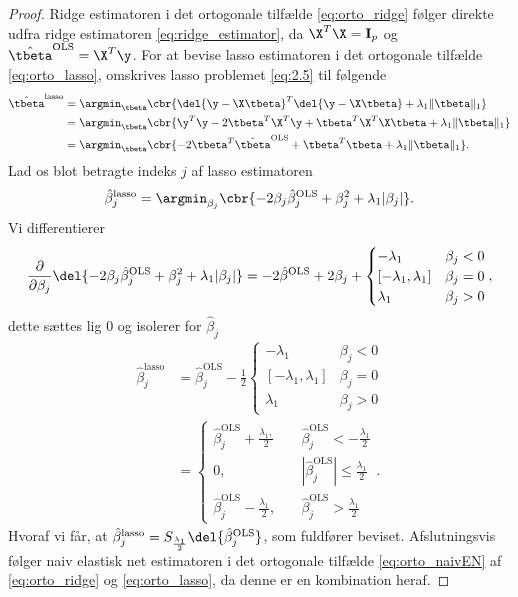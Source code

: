 \begin{proof}
Ridge estimatoren i det ortogonale tilfælde \eqref{eq:orto_ridge} følger direkte udfra ridge estimatoren \eqref{eq:ridge_estimator}, da \(\X^T \X = \mathbf{I}_p\) og \(\hat{\tbeta}^\text{OLS} = \X^T \y\).
For at bevise lasso estimatoren i det ortogonale tilfælde \eqref{eq:orto_lasso}, omskrives lasso problemet \eqref{eq:2.5} til følgende
\begin{align*}
\hat{\tbeta}^\text{lasso} &= \argmin_{\tbeta} \cbr{\del{\y - \X \tbeta}^T \del{\y - \X \tbeta} + \lambda_1 \Vert \tbeta \Vert_1} \\
&= \argmin_{\tbeta} \cbr{ \y^T \y - 2 \tbeta^T \X^T \y + \tbeta^T \X^T \X \tbeta + \lambda_1 \Vert \tbeta \Vert_1} \\
&= \argmin_{\tbeta} \cbr{- 2 \tbeta^T \hat{\tbeta}^\text{OLS} + \tbeta^T \tbeta + \lambda_1 \Vert \tbeta \Vert_1}.
\end{align*}
Lad os blot betragte indeks \(j\) af lasso estimatoren
\begin{align*}
\hat{\beta}_j^\text{lasso} = \argmin_{\beta_j} \cbr{ - 2 \beta_j \hat{\beta}_j^\text{OLS} + \beta_j^2 + \lambda_1 \vert \beta_j \vert}.
\end{align*}
Vi differentierer
\begin{align*}
\frac{\partial}{\partial \beta_j} \del{- 2 \beta_j \hat{\beta}_j^\text{OLS} + \beta_j^2 + \lambda_1 \vert \beta_j \vert}
=-2\hat{\beta}^\text{OLS} + 2\beta_j + \begin{cases}
-\lambda_1 \quad &\beta_j < 0 \\
[-\lambda_1, \lambda_1] & \beta_j = 0 \\
\lambda_1 & \beta_j >0 
\end{cases},
\end{align*}
dette sættes lig \(0\) og isolerer for \(\hat{\beta}_j\)
\begin{align*}
\hat{\beta}_j^\text{lasso} &= \hat{\beta}_j^\text{OLS} - \frac{1}{2}\begin{cases}
-\lambda_1 \quad &\beta_j < 0 \\
[-\lambda_1, \lambda_1] & \beta_j = 0 \\
\lambda_1 & \beta_j >0 
\end{cases} \\
&= \begin{cases}
\hat{\beta}_j^\text{OLS} + \frac{\lambda_1,}{2} \quad &\hat{\beta}_j^\text{OLS} < - \frac{\lambda_1}{2} \\
0, &\left\vert\hat{\beta}_j^\text{OLS} \right\vert \leq \frac{\lambda_1}{2} \\
\hat{\beta}_j^\text{OLS} - \frac{\lambda_1}{2}, \quad &\hat{\beta}_j^\text{OLS} > \frac{\lambda_1}{2}
\end{cases}. 
\end{align*}
Hvoraf vi får, at \(\hat{\beta}_j^\text{lasso} = S_{\frac{\lambda_1}{2}} \del{ \hat{\beta}_j^\text{OLS}} \), som fuldfører beviset.
Afslutningsvis følger naiv elastisk net estimatoren i det ortogonale tilfælde \eqref{eq:orto_naivEN} af \eqref{eq:orto_ridge} og \eqref{eq:orto_lasso}, da denne er en kombination heraf.
\end{proof}
